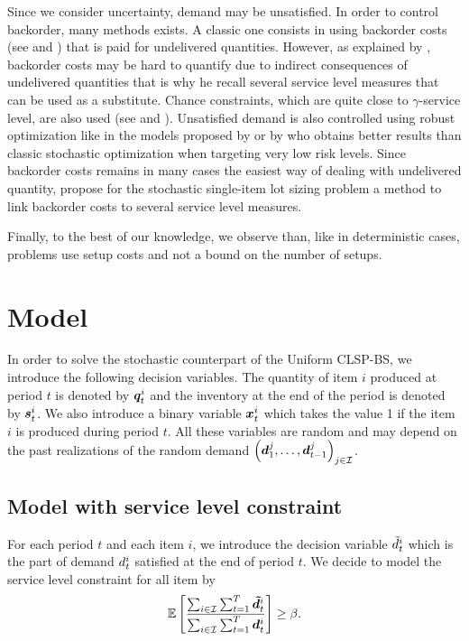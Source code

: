Since we consider uncertainty, demand may be unsatisfied.
In order to control backorder, many methods exists.
A classic one consists in using backorder costs (see \citet{Zangwill1969} and \citet{Absi2009}) that is paid for undelivered quantities.
However, as explained by \citet{Tempelmeier2013}, backorder costs may be hard to quantify due to indirect consequences of undelivered quantities that is why he recall several service level measures that can be used as a substitute.
Chance constraints, which are quite close to $\gamma$-service level, are also used (see \citet{Tarim2004} and \citet{Gicquel2018}).
Unsatisfied demand is also controlled using robust optimization like in the models proposed by \citet{Gyulai2017} or by \citet{Minoux2018} who obtains better results than classic stochastic optimization when targeting very low risk levels.
Since backorder costs remains in many cases the easiest way of dealing with undelivered quantity, \citet{vanHoutum2000} propose for the stochastic single-item lot sizing problem a method to link backorder costs to several service level measures.


Finally, to the best of our knowledge, we observe than, like in deterministic cases, problems use setup costs and not a bound on the number of setups.


\section{Model}
\label{sec:PDP:stochastic:model}

In order to solve the stochastic counterpart of the Uniform CLSP-BS, we introduce the following decision variables.
The quantity of item $i$ produced at period $t$ is denoted by $\va\quantity_t^i$ and the inventory at the end of the period is denoted by $\va\inventory_t^i$.
We also introduce a binary variable $\va\setup_t^i$ which takes the value 1 if the item $i$ is produced during period $t$.
All these variables are random and may depend on the past realizations of the random demand $\bracket{\va\demand_1^j,\ldots,\va\demand_{t-1}^j}_{j\in\REF}$.


\subsection{Model with service level constraint}

For each period $t$ and each item $i$, we introduce the decision variable $\tilde{d}_t^i$ which is the part of demand $d_t^i$ satisfied at the end of period $t$.
We decide to model the service level constraint for all item by
\begin{equation}
  \label{eq:service-level-constraint}
  \espe\sqbracket{ \frac{\sum_{i\in\REF}\sum_{t=1}^{\horizon}\va\supplied_t^i}{\sum_{i\in\REF}\sum_{t=1}^{\horizon}\va\demand_t^i} }
  \geq \servicelvl.
\end{equation}

